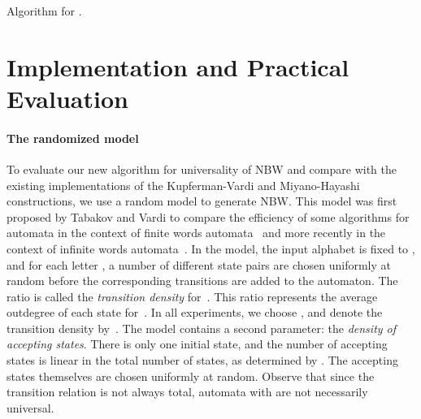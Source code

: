 \documentclass{LMCS}
\begin{document}
\begin{algorithm}[!tbp]
  \flushleft
  \medskip

\caption{Algorithm for . \label{alg:pre}}

\end{algorithm}








\section{Implementation and Practical Evaluation}\label{sec:implementation}

\paragraph{{\bf The randomized model}}
To evaluate our new algorithm for universality of NBW and compare with
the existing implementations of the Kupferman-Vardi and Miyano-Hayashi
constructions, we use a random model to generate NBW.  This model was
first proposed by Tabakov and Vardi to compare the efficiency of
some algorithms for automata in the context of finite words 
automata~\cite{TabakovV05} and more recently in the context of infinite
words automata~\cite{TabakovV07}.
In the model, the input alphabet is fixed to , and for
each letter , a number  of different
state pairs  are chosen uniformly at
random before the corresponding transitions  are
added to the automaton.  The ratio 
is called the \emph{transition density} for~.  This ratio
represents the average outdegree of each state for~.  In all
experiments, we choose , and denote the transition density
by~.  The model contains a second parameter: the \emph{density 
  of accepting states}.  There is only one initial state, and the
number  of accepting states is linear in the total number of
states, as determined by .  The accepting states
themselves are chosen uniformly at random.  Observe that since the
transition relation is not always total, automata with  are not
necessarily universal.
\end{document}
